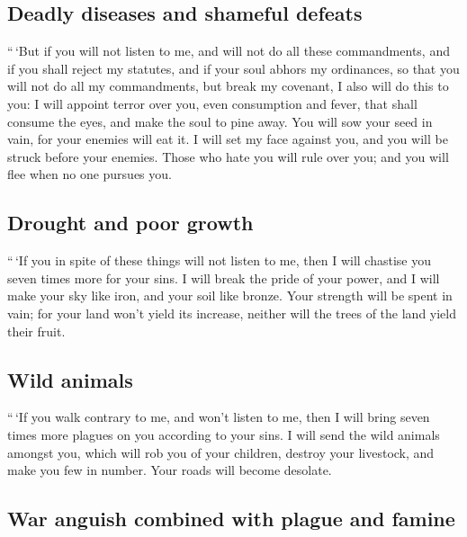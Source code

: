 \hypertarget{deadly-diseases-and-shameful-defeats}{%
\subsection{Deadly diseases and shameful
defeats}\label{deadly-diseases-and-shameful-defeats}}

 ``\,`But if you will not listen to me, and will not do
all these commandments,  and if you shall reject my
statutes, and if your soul abhors my ordinances, so that you will not do
all my commandments, but break my covenant,  I also will
do this to you: I will appoint terror over you, even consumption and
fever, that shall consume the eyes, and make the soul to pine away. You
will sow your seed in vain, for your enemies will eat it.
 I will set my face against you, and you will be struck
before your enemies. Those who hate you will rule over you; and you will
flee when no one pursues you.

\hypertarget{drought-and-poor-growth}{%
\subsection{Drought and poor growth}\label{drought-and-poor-growth}}

 ``\,`If you in spite of these things will not listen to
me, then I will chastise you seven times more for your sins.
 I will break the pride of your power, and I will make
your sky like iron, and your soil like bronze.  Your
strength will be spent in vain; for your land won't yield its increase,
neither will the trees of the land yield their fruit.

\hypertarget{wild-animals}{%
\subsection{Wild animals}\label{wild-animals}}

 ``\,`If you walk contrary to me, and won't listen to me,
then I will bring seven times more plagues on you according to your
sins.  I will send the wild animals amongst you, which
will rob you of your children, destroy your livestock, and make you few
in number. Your roads will become desolate.

\hypertarget{war-anguish-combined-with-plague-and-famine}{%
\subsection{War anguish combined with plague and
famine}\label{war-anguish-combined-with-plague-and-famine}}

